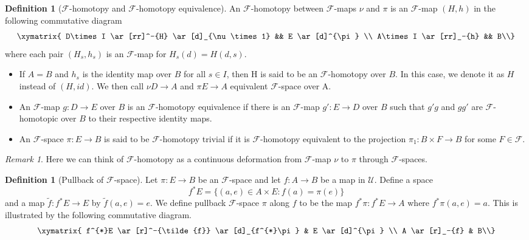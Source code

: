 \documentclass[psamsfonts]{amsart}
\theoremstyle{definition}
\newtheorem{defn}[thm]{Definition}
\theoremstyle{remark}
\newtheorem{rem}[thm]{Remark}
\numberwithin{equation}{section}
\begin{document}
\begin{defn}[$\mathcal{F}$-homotopy and $\mathcal{F}$-homotopy equivalence]
An $\mathcal{F}$-homotopy between $\mathcal{F}$-maps $\nu$ and $\pi$ is an $\mathcal{F}$-map $(H, h)$ in the following commutative diagram
\[\xymatrix{
D\times I \ar[rr]^-{H} \ar[d]_{\nu \times 1} && E \ar[d]^{\pi} \\
A\times I \ar[rr]_-{h} && B\\} \]
where each pair $(H_{s}, h_{s})$ is an $\mathcal{F}$-map for $H_{s}(d) = H(d, s)$. 
\begin{itemize}
	\item If $A = B$ and $h_{s}$ is the identity map over $B$ for all $s \in I$, then H is said to be an $\mathcal{F}$-homotopy over $B$. In this case, we denote it as  $H$ instead of $(H, id)$. We then call $\nu D \to A$ and $\pi E \to A$ equivalent $\mathcal{F}$-space over A.
	\item An $\mathcal{F}$-map $g: D \rightarrow E$  over $B$ is an $\mathcal{F}$-homotopy equivalence if there is an $\mathcal{F}$-map $g': E \rightarrow D$ over $B$ such that $g'g$ and $gg'$ are $\mathcal{F}$-homotopic over $B$ to their respective identity maps.
	\item An $\mathcal{F}$-space $\pi: E \rightarrow B$ is said to be $\mathcal{F}$-homotopy trivial if it is $\mathcal{F}$-homotopy equivalent to the projection $\pi_{1}: B \times F \rightarrow B$ for some $F \in \mathcal{F}$.
\end{itemize}
\end{defn}

\begin{rem}
Here we can think of $\mathcal{F}$-homotopy as a continuous deformation from $\mathcal{F}$-map $\nu$ to $\pi$ through $\mathcal{F}$-spaces.	
\end{rem}

\begin{defn}[Pullback of $\mathcal{F}$-space]
Let $\pi: E \rightarrow B$ be an $\mathcal{F}$-space and let $f: A \rightarrow B$ be a map in $\mathcal{U}$. Define a space $$f^{*}E = \{(a, e) \in A \times E: f(a) = \pi(e)\}$$ and a map $ \tilde{f}: f^{*}E \rightarrow E$ by $\tilde{f}(a, e) = e$. We define pullback $\mathcal{F}$-space $\pi$ along $f$ to be the map $f^{*}\pi: f^{*}E \rightarrow A$ where $ f^{*}\pi(a, e) = a$. This is illustrated by the following commutative diagram. 
\[\xymatrix{
f^{*}E \ar[r]^-{\tilde{f}} \ar[d]_{f^{*}\pi} & E \ar[d]^{\pi} \\
A \ar[r]_-{f} & B\\} \]
\end{defn}
\end{document}

